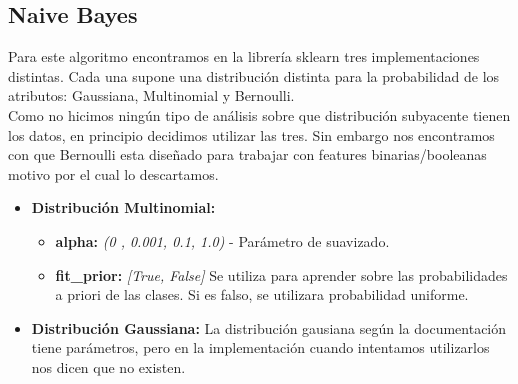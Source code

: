 \subsection{Naive Bayes}
Para este algoritmo encontramos en la librería sklearn tres implementaciones distintas. Cada una supone una distribución
distinta para la probabilidad de los atributos: Gaussiana, Multinomial y Bernoulli.\\
Como no hicimos ningún tipo de análisis sobre que distribución subyacente tienen los datos, en principio decidimos utilizar
las tres. Sin embargo nos encontramos con que Bernoulli esta diseñado para trabajar con features binarias/booleanas motivo
por el cual lo descartamos.

\begin{itemize}
\item \textbf{Distribución Multinomial:}
        \begin{itemize}
        \item \textbf{alpha:} \textit{(0 , 0.001, 0.1, 1.0)} - Parámetro de suavizado.
        \item \textbf{fit\_prior:} \textit{[True, False]} Se utiliza para aprender sobre las probabilidades a priori de las clases. Si es falso, se utilizara probabilidad uniforme.
        \end{itemize}
\item \textbf{Distribución Gaussiana:} La distribución gausiana según la documentación tiene parámetros, pero en la implementación cuando intentamos utilizarlos nos dicen que no existen.
\end{itemize}
